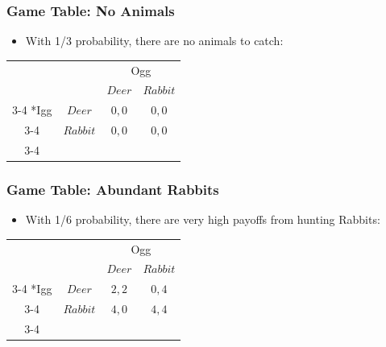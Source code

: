 
\begin{frame}
\frametitle{Game Table: No Animals}
\begin{itemize}
\item With 1/3 probability, there are no animals to catch:
\end{itemize}
\begin{table}[h]
\centering
 

\begin{tabular}{cc|c|c|}
	& \multicolumn{1}{c}{} & \multicolumn{2}{c}{Ogg}\\
	& \multicolumn{1}{c}{} & \multicolumn{1}{c}{$Deer$}  & \multicolumn{1}{c}{$Rabbit$} \\\cline{3-4}
	\multirow{2}*{Igg}  & $Deer$ & $0, 0$ & $0, 0$ \\\cline{3-4}
	& $Rabbit$ & $0, 0$ & $0, 0$ \\\cline{3-4}
\end{tabular}
\end{table}
\end{frame}


\begin{frame}
\frametitle{Game Table: Abundant Rabbits}
\begin{itemize}
\item With 1/6 probability, there are very high payoffs from hunting Rabbits:
\end{itemize}
\begin{table}[h]
\centering
 

\begin{tabular}{cc|c|c|}
	& \multicolumn{1}{c}{} & \multicolumn{2}{c}{Ogg}\\
	& \multicolumn{1}{c}{} & \multicolumn{1}{c}{$Deer$}  & \multicolumn{1}{c}{$Rabbit$} \\\cline{3-4}
	\multirow{2}*{Igg}  & $Deer$ & $2, 2$ & $0, 4$ \\\cline{3-4}
	& $Rabbit$ & $4, 0$ & $4, 4$ \\\cline{3-4}
\end{tabular}
\end{table}
\end{frame}

